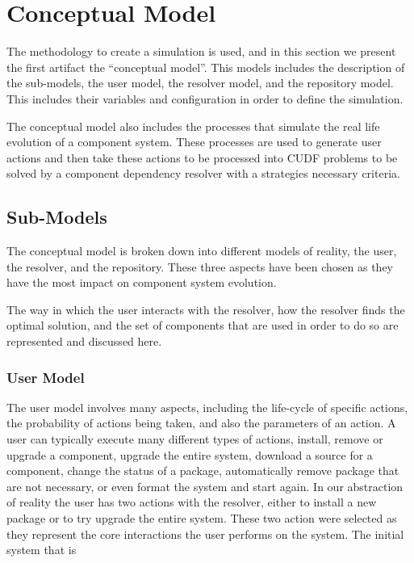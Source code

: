 \section{Conceptual Model}
The methodology to create a simulation is used, and in this section we present the first artifact the ``conceptual model''.
This models includes the description of the sub-models, the user model, the resolver model, and the repository model.
This includes their variables and configuration in order to define the simulation.

The conceptual model also includes the processes that simulate the real life evolution of a component system.
These processes are used to generate user actions and then take these actions to be processed into CUDF problems
to be solved by a component dependency resolver with a strategies necessary criteria.

\subsection{Sub-Models}
The conceptual model is broken down into different models of reality, the user, the resolver, and the repository.
These three aspects have been chosen as they have the most impact on component system evolution.

The way in which the user interacts with the resolver, how the resolver finds the optimal solution, and the set of components that are used in order to do so
are represented and discussed here.


\subsubsection{User Model}
The user model involves many aspects, including the life-cycle of specific actions, the probability of actions being taken, and also the parameters of an action.
A user can typically execute many different types of actions, install, remove or upgrade a component, upgrade the entire system,
download a source for a component, change the status of a package, automatically remove package that are not necessary, or even format the system and start again.
In our abstraction of reality the user has two actions with the resolver, either to install a new package or to try upgrade the entire system.
These two action were selected as they represent the core interactions the user performs on the system.
The initial system that is 

